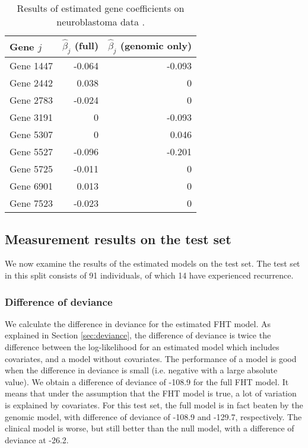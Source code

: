 \begin{table}
\caption{Results of estimated gene coefficients on neuroblastoma data \citep{oberthuer-data}.}
\label{tab:oberthuer-beta}
\centering
\begin{tabular}{lrr}
\toprule
Gene $j$      & $\hat{\beta}_j$ (full) & $\hat{\beta}_j$ (genomic only)\\
\hline

Gene 1447 & -0.064 & -0.093 \\
Gene 2442 &  0.038 &      0 \\
Gene 2783 & -0.024 &      0 \\
Gene 3191 &      0 & -0.093 \\
Gene 5307 &      0 &  0.046 \\
Gene 5527 & -0.096 & -0.201 \\
Gene 5725 & -0.011 &      0 \\
Gene 6901 &  0.013 &      0 \\
Gene 7523 & -0.023 &      0 \\
\bottomrule
\end{tabular}
\end{table}

\subsection{Measurement results on the test set}
We now examine the results of the estimated models on the test set.
The test set in this split consists of 91 individuals, of which 14 have experienced recurrence.

\subsubsection{Difference of deviance}
We calculate the difference in deviance for the estimated FHT model.
As explained in Section \ref{sec:deviance}, the difference of deviance is twice the difference between the log-likelihood for an estimated model which includes covariates, and a model without covariates.
The performance of a model is good when the difference in deviance is small (i.e. negative with a large absolute value).
We obtain a difference of deviance of -108.9 for the full FHT model.
It means that under the assumption that the FHT model is true, a lot of variation is explained by covariates.
For this test set, the full model is in fact beaten by the genomic model, with difference of deviance of -108.9 and -129.7, respectively.
The clinical model is worse, but still better than the null model, with a difference of deviance at -26.2.

